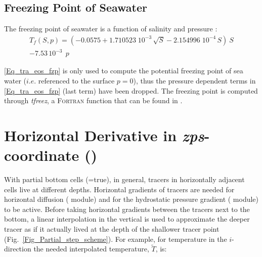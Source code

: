 \subsection   [Freezing Point of Seawater]
			{Freezing Point of Seawater}
\label{TRA_fzp}

The freezing point of seawater is a function of salinity and pressure \citep{UNESCO1983}:
\begin{equation} \label{Eq_tra_eos_fzp}
   \begin{split}
T_f (S,p) = \left( -0.0575 + 1.710523 \;10^{-3} \, \sqrt{S} 
						     -  2.154996 \;10^{-4} \,S  \right) \ S    \\
               - 7.53\,10^{-3} \ \ p 
   \end{split}
\end{equation}

\eqref{Eq_tra_eos_fzp} is only used to compute the potential freezing point of 
sea water ($i.e.$ referenced to the surface $p=0$), thus the pressure dependent 
terms in \eqref{Eq_tra_eos_fzp} (last term) have been dropped. The freezing
point is computed through \textit{tfreez}, a \textsc{Fortran} function that can be found 
in .  

\section  [Horizontal Derivative in \textit{zps}-coordinate (\textit{zpshde})]
		{Horizontal Derivative in \textit{zps}-coordinate ()}
\label{TRA_zpshde}


With partial bottom cells (=true), in general, tracers in horizontally 
adjacent cells live at different depths. Horizontal gradients of tracers are needed 
for horizontal diffusion ( module) and for the hydrostatic pressure 
gradient ( module) to be active. 
Before taking horizontal gradients between the tracers next to the bottom, a linear 
interpolation in the vertical is used to approximate the deeper tracer as if it actually 
lived at the depth of the shallower tracer point (Fig.~\ref{Fig_Partial_step_scheme}). 
For example, for temperature in the $i$-direction the needed interpolated 
temperature, $\widetilde{T}$, is:

